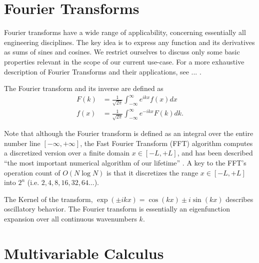 
\section{Fourier Transforms}
Fourier transforms have a wide range of applicability, concerning essentially
all engineering disciplines. The key idea is to express any function and its
derivatives as sums of sines and cosines. We restrict ourselves to discuss only
some basic properties relevant in the scope of our current use-case. For a more
exhaustive description of Fourier Transforms and their applications, see ...
.

The Fourier transform and its inverse are defined as
\begin{align*}
    F(k) &= \frac{1}{\sqrt{2\pi}}\int_{-\infty}^{\infty}e^{ikx}f(x)dx \\
    f(x) &= \frac{1}{\sqrt{2\pi}}\int_{-\infty}^{\infty}e^{-ikx}F(k)dk.
\end{align*}

Note that although the Fourier transform is defined as an integral over the
entire number line $[-\infty, +\infty]$, the Fast Fourier Transform (FFT)
algorithm computes a discretized version over a finite domain $x \in [-L, +L]$,
and has been described ``the most important numerical algorithm of our
lifetime'' \citep{fft-important}. A key to the FFT's operation count of $O(N
\log N)$ is that it discretizes the range $x \in [-L, +L]$ into $2^n$ (i.e.
$2,4,8,16,32,64\dots$).

The Kernel of the transform, $\exp(\pm ikx) = \cos(kx) \pm i\sin(kx)$ describes
oscillatory behavior. The Fourier transform is essentially an eigenfunction
expansion over all continuous wavenumbers $k$.



\section{Multivariable Calculus}
